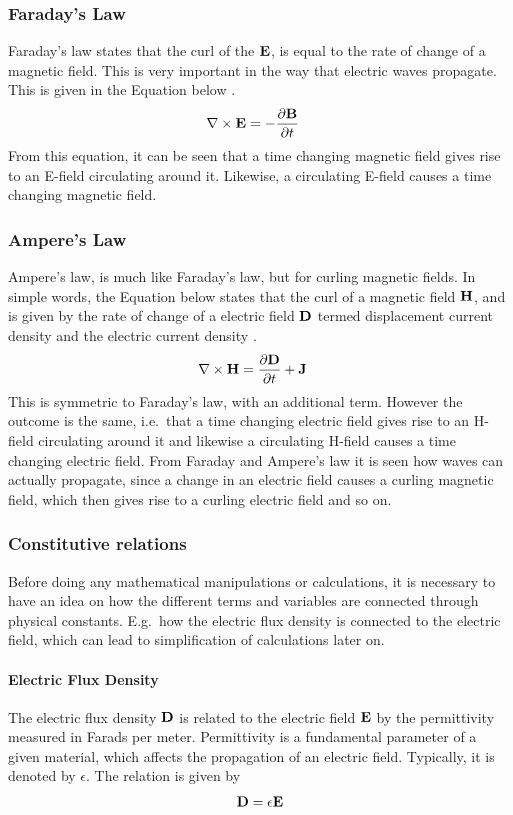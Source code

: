 \subsubsection{Faraday's Law}%
Faraday's law states that the curl of the $\bold{E}$, is equal to the rate of change of a magnetic field. This is very important in the way that electric waves propagate. This is given in the Equation below \cite{taflove2000computional}. 
\begin{align}
\nabla \times \bold{E} &= - \frac{\partial \bold{B}}{\partial t}
\end{align}
From this equation, it can be seen that a time changing magnetic field gives rise to an E-field circulating around it. Likewise, a circulating E-field causes a time changing magnetic field.

\subsubsection{Ampere's Law}
Ampere's law, is much like Faraday's law, but for curling magnetic fields. In simple words, the Equation below states that the curl of a magnetic field $\bold{H}$, and is given by the rate of change of a electric field $\bold{D}$ termed displacement current density and the electric current density \cite{taflove2000computional}.
\begin{align}%
\nabla \times \bold{H} &= \frac{\partial \bold{D}}{\partial t} + \bold{J} 
\end{align}
This is symmetric to Faraday's law, with an additional term. However the outcome is the same, i.e.\ that a time changing electric field gives rise to an H-field circulating around it and likewise a circulating H-field causes a time changing electric field. From Faraday and Ampere's law it is seen how waves can actually propagate, since a change in an electric field causes a curling magnetic field, which then gives rise to a curling electric field and so on.    

\subsubsection{Constitutive relations}
Before doing any mathematical manipulations or calculations, it is necessary to have an idea on how the different terms and variables are connected through physical constants. E.g.\ how the electric flux density is connected to the electric field, which can lead to simplification of calculations later on.

\paragraph{Electric Flux Density} The electric flux density $\bold{D}$ is related to the electric field $\bold{E}$ by the permittivity measured in Farads per meter. Permittivity is a fundamental parameter of a given material, which affects the propagation of an electric field. Typically, it is denoted by $\epsilon$. The relation is given by \cite{taflove2000computional}
\begin{align}
  \bold{D} = \epsilon \bold{E}
\end{align}


